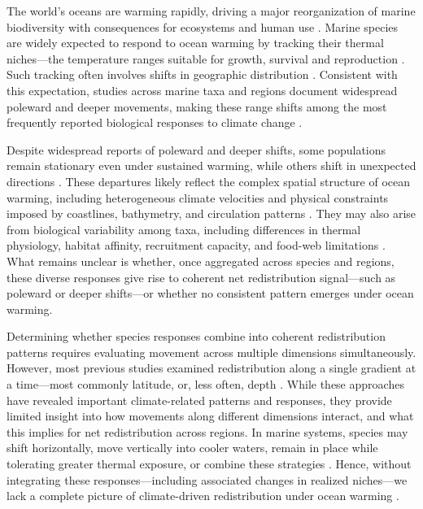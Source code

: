 \documentclass[9pt,twocolumn,twoside]{pnas-new}
\begin{document}
The world's oceans are warming rapidly, driving a major reorganization of marine biodiversity with consequences for ecosystems and human use \citep{ipcc_ocean_2022, pinsky_preparing_2018, palacios-abrantes_climate_2025, pecl_biodiversity_2017}. Marine species are widely expected to respond to ocean warming by tracking their thermal niches---the temperature ranges suitable for growth, survival and reproduction \citep{grinnell_niche-relationships_1917}. Such tracking often involves shifts in geographic distribution \citep{tingley_birds_2009}. Consistent with this expectation, studies across marine taxa and regions document widespread poleward and deeper movements, making these range shifts among the most frequently reported biological responses to climate change \citep{parmesan_globally_2003, parmesan_ecological_2006, poloczanska_global_2013, poloczanska_responses_2016}.

Despite widespread reports of poleward and deeper shifts, some populations remain stationary even under sustained warming, while others shift in unexpected directions \citep{rubenstein_climate_2023, fuchs_wrong-way_2020, lawlor_mechanisms_2024}. These departures likely reflect the complex spatial structure of ocean warming, including heterogeneous climate velocities and physical constraints imposed by coastlines, bathymetry, and circulation patterns \citep{burrows_pace_2011, pinsky_marine_2013}. They may also arise from biological variability among taxa, including differences in thermal physiology, habitat affinity, recruitment capacity, and food-web limitations \citep{sunday_species_2015, roberts_substrate-dependent_2020, britten_changing_2016, zhang_food-web_2017}. What remains unclear is whether, once aggregated across species and regions, these diverse responses give rise to coherent net redistribution signal---such as poleward or deeper shifts---or whether no consistent pattern emerges under ocean warming.

\Parasplit

Determining whether species responses combine into coherent redistribution patterns requires evaluating movement across multiple dimensions simultaneously. However, most previous studies examined redistribution along a single gradient at a time---most commonly latitude, or, less often, depth \citep{lenoir_climate-related_2015}. While these approaches have revealed important climate-related patterns and responses, they provide limited insight into how movements along different dimensions interact, and what this implies for net redistribution across regions. In marine systems, species may shift horizontally, move vertically into cooler waters, remain in place while tolerating greater thermal exposure, or combine these strategies \citep{nye_changing_2009}. Hence, without integrating these responses---including associated changes in realized niches---we lack a complete picture of climate-driven redistribution under ocean warming \citep{lawlor_mechanisms_2024, fredston_reimagining_2025}.
\end{document}
